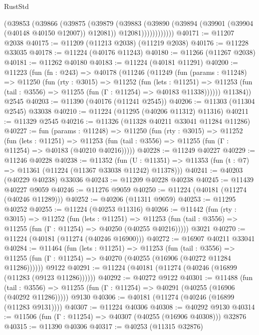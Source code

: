 \begin{lexlean}{RustStd}
\begin{coremodule}
                (@39853
                  (@39866
                    (@39875
                      (@39879
                        (@39883
                          (@39890
                            (@39894 (@39901 (@39904 (@40148 @40150 @12007)) @12081))
                            @12081))))))))))))
@40171 := @11207 @2038
@40175 := @11209 (@11213 @2038) (@11219 @2038)
@40176 := @11228 @33035
@40178 := @11224 (@40176 @11243)
@40180 := @11266 (@11267 @2038)
@40181 := @11262 @40180
@40183 := @11224 (@40181 @11291)
@40200 := @11223
    (fun (fn : @243) =>
    @40178
      (@11246
        (@11249
          (fun (params : @11248) =>
          @11250
            (fun (rty : @3015) =>
            @11252
              (fun (lets : @11251) =>
              @11253 (fun (tail : @3556) => @11255 (fun (Γ : @11254) => @40183 @11338))))))
        @11384))
    @2545
@40203 := @11390 (@40176 (@11241 @2545))
@40206 := @11303 (@11304 @2545) @33038
@40210 := @11224 (@11295 (@40206 @11312) @11316)
@40211 := @11329 @2545
@40216 := @11326 (@11328 @40211 @33041 @11284 @11286)
@40227 := fun (params : @11248) =>
  @11250
    (fun (rty : @3015) =>
    @11252
      (fun (lets : @11251) =>
      @11253 (fun (tail : @3556) => @11255 (fun (Γ : @11254) => @40183 (@40210 @40216)))))
@40228 := @11249 @40227
@40229 := @11246 @40228
@40238 := @11352
    (fun (U : @11351) => @11353 (fun (t : @7) => @11361 (@11224 (@11367 @33038 @11242) @11378)))
@40241 := @40203 (@40229 @40238) @33036
@40243 := @11209 @40228 @40238
@40245 := @11439 @40227 @9059
@40246 := @11276 @9059
@40250 := @11224 (@40181 (@11274 (@40246 @11289)))
@40252 := @40206 (@11311 @9059)
@40253 := @11295 @40252
@40255 := @11224 (@40253 @11316)
@40266 := @11442
    (fun (rty : @3015) =>
    @11252
      (fun (lets : @11251) =>
      @11253 (fun (tail : @3556) => @11255 (fun (Γ : @11254) => @40250 (@40255 @40216)))))
    @3021
@40270 := @11224 (@40181 (@11274 (@40246 @16900)))
@40272 := @16907 @40211 @33041
@40284 := @11464
    (fun (lets : @11251) =>
    @11253
      (fun (tail : @3556) =>
      @11255 (fun (Γ : @11254) => @40270 (@40255 (@16906 (@40272 @11284 @11286))))))
    @9122
@40291 := @11224 (@40181 (@11274 (@40246 (@16899 (@11283 (@9123 @11286))))))
@40292 := @40272 @9122
@40301 := @11488
    (fun (tail : @3556) => @11255 (fun (Γ : @11254) => @40291 (@40255 (@16906 (@40292 @11286)))))
    @9130
@40306 := @40181 (@11274 (@40246 (@16899 (@11283 @9131))))
@40307 := @11224 @40306
@40308 := @40292 @9130
@40314 := @11506 (fun (Γ : @11254) => @40307 (@40255 (@16906 @40308))) @32876
@40315 := @11390 @40306
@40317 := @40253 (@11315 @32876)

\end{coremodule}
\end{lexlean}
